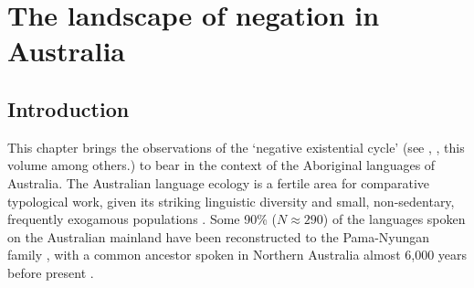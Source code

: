 \chapter{The landscape of negation in Australia}\label{NEC1}
\section{Introduction}
\reversemarginpar
This chapter brings the observations of the `negative existential cycle' (see \citealt{Croft1991}, \citealt{Veselinova2013,Veselinova2016}, this volume among others.) to bear in the context of the Aboriginal languages of Australia. The Australian language ecology is a fertile area for comparative typological work, given its striking linguistic diversity and small, non-sedentary, frequently exogamous populations \citep{Bowern2010}. Some 90\% ($N\approx290$) of the languages spoken on the Australian mainland have been reconstructed to the Pama-Nyungan family \citep[see also ][]{OVV1966,Wurm1972,Bowern2012b}, with a common ancestor spoken in Northern Australia almost 6,000 years before present \citep{Bouckaert2018}.

